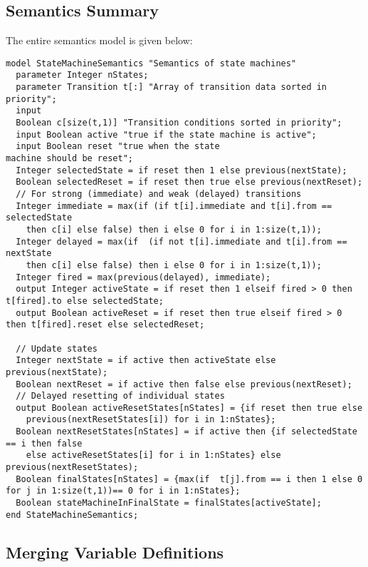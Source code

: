\subsection{Semantics Summary}

The entire semantics model is given below:

\begin{lstlisting}[language=modelica]
model StateMachineSemantics "Semantics of state machines"
  parameter Integer nStates;
  parameter Transition t[:] "Array of transition data sorted in priority";
  input
  Boolean c[size(t,1)] "Transition conditions sorted in priority";
  input Boolean active "true if the state machine is active";
  input Boolean reset "true when the state
machine should be reset";
  Integer selectedState = if reset then 1 else previous(nextState);
  Boolean selectedReset = if reset then true else previous(nextReset);
  // For strong (immediate) and weak (delayed) transitions
  Integer immediate = max(if (if t[i].immediate and t[i].from == selectedState 
    then c[i] else false) then i else 0 for i in 1:size(t,1));
  Integer delayed = max(if  (if not t[i].immediate and t[i].from == nextState 
    then c[i] else false) then i else 0 for i in 1:size(t,1));
  Integer fired = max(previous(delayed), immediate);
  output Integer activeState = if reset then 1 elseif fired > 0 then t[fired].to else selectedState;
  output Boolean activeReset = if reset then true elseif fired > 0 then t[fired].reset else selectedReset;
  
  // Update states
  Integer nextState = if active then activeState else previous(nextState);
  Boolean nextReset = if active then false else previous(nextReset);
  // Delayed resetting of individual states
  output Boolean activeResetStates[nStates] = {if reset then true else 
    previous(nextResetStates[i]) for i in 1:nStates};
  Boolean nextResetStates[nStates] = if active then {if selectedState == i then false 
    else activeResetStates[i] for i in 1:nStates} else previous(nextResetStates);
  Boolean finalStates[nStates] = {max(if  t[j].from == i then 1 else 0 for j in 1:size(t,1))== 0 for i in 1:nStates};
  Boolean stateMachineInFinalState = finalStates[activeState];
end StateMachineSemantics;
\end{lstlisting}
\subsection{Merging Variable Definitions}

